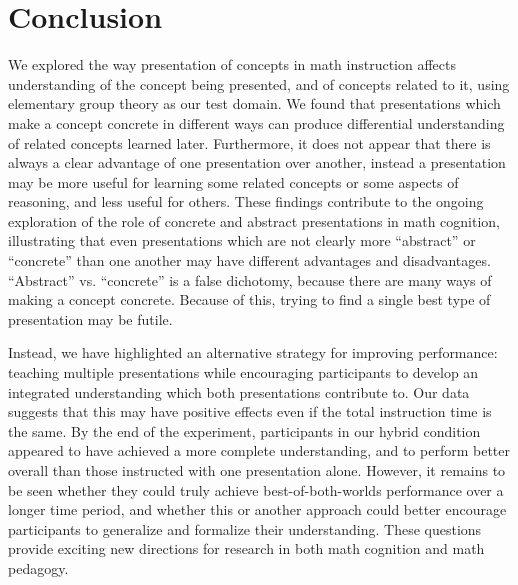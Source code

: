 \documentclass[man,10pt]{apa6}
\begin{document}
\section{Conclusion}
We explored the way presentation of concepts in math instruction affects understanding of the concept being presented, and of concepts related to it, using elementary group theory as our test domain. We found that presentations which make a concept concrete in different ways can produce differential understanding of related concepts learned later. Furthermore, it does not appear that there is always a clear advantage of one presentation over another, instead a presentation may be more useful for learning some related concepts or some aspects of reasoning, and less useful for others. These findings contribute to the ongoing exploration of the role of concrete and abstract presentations in math cognition, illustrating that even presentations which are not clearly more ``abstract'' or ``concrete'' than one another may have different advantages and disadvantages. ``Abstract'' vs. ``concrete'' is a false dichotomy, because there are many ways of making a concept concrete. Because of this, trying to find a single best type of presentation may be futile. \par
Instead, we have highlighted an alternative strategy for improving performance: teaching multiple presentations while encouraging participants to develop an integrated understanding which both presentations contribute to. Our data suggests that this may have positive effects even if the total instruction time is the same. By the end of the experiment, participants in our hybrid condition appeared to have achieved a more complete understanding, and to perform better overall than those instructed with one presentation alone. However, it remains to be seen whether they could truly achieve best-of-both-worlds performance over a longer time period, and whether this or another approach could better encourage participants to generalize and formalize their understanding. These questions provide exciting new directions for research in both math cognition and math pedagogy. \par %
 
\end{document}
